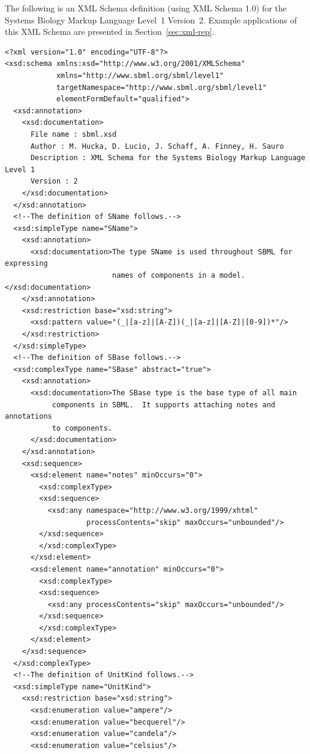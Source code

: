 \documentclass[10pt]{cekarticle}
\newcommand{\changed}[1]{\textcolor{BrickRed}{#1}}
\newenvironment{blockChanged}{\color{BrickRed}}{}
\begin{document}
The following is an XML Schema definition (using XML Schema 1.0) for the
Systems Biology Markup Language Level~1 \changed{Version~2}.  Example
applications of this XML Schema are presented in Section~\ref{sec:xml-rep}.

\begin{blockChanged}
\begin{small}
\tightspacing
\begin{verbatim}
<?xml version="1.0" encoding="UTF-8"?>
<xsd:schema xmlns:xsd="http://www.w3.org/2001/XMLSchema"
            xmlns="http://www.sbml.org/sbml/level1"
            targetNamespace="http://www.sbml.org/sbml/level1"
            elementFormDefault="qualified">
  <xsd:annotation>
    <xsd:documentation>
      File name : sbml.xsd
      Author : M. Hucka, D. Lucio, J. Schaff, A. Finney, H. Sauro
      Description : XML Schema for the Systems Biology Markup Language Level 1
      Version : 2
    </xsd:documentation>
  </xsd:annotation>
  <!--The definition of SName follows.-->
  <xsd:simpleType name="SName">
    <xsd:annotation>
      <xsd:documentation>The type SName is used throughout SBML for expressing 
                         names of components in a model.</xsd:documentation>
    </xsd:annotation>
    <xsd:restriction base="xsd:string">
      <xsd:pattern value="(_|[a-z]|[A-Z])(_|[a-z]|[A-Z]|[0-9])*"/>
    </xsd:restriction>
  </xsd:simpleType>
  <!--The definition of SBase follows.-->
  <xsd:complexType name="SBase" abstract="true">
    <xsd:annotation>
      <xsd:documentation>The SBase type is the base type of all main
           components in SBML.  It supports attaching notes and annotations
           to components.
      </xsd:documentation>
    </xsd:annotation>
    <xsd:sequence>
      <xsd:element name="notes" minOccurs="0">
      	<xsd:complexType>
        <xsd:sequence>
          <xsd:any namespace="http://www.w3.org/1999/xhtml"
                   processContents="skip" maxOccurs="unbounded"/>
        </xsd:sequence>
      	</xsd:complexType>
      </xsd:element>
      <xsd:element name="annotation" minOccurs="0">
      	<xsd:complexType>
        <xsd:sequence>
          <xsd:any processContents="skip" maxOccurs="unbounded"/>
        </xsd:sequence>
      	</xsd:complexType>
      </xsd:element>
    </xsd:sequence>
  </xsd:complexType>
  <!--The definition of UnitKind follows.-->
  <xsd:simpleType name="UnitKind">
    <xsd:restriction base="xsd:string">
      <xsd:enumeration value="ampere"/>
      <xsd:enumeration value="becquerel"/>
      <xsd:enumeration value="candela"/>
      <xsd:enumeration value="celsius"/>

\end{verbatim}
\end{small}
\end{blockChanged}
\end{document}
